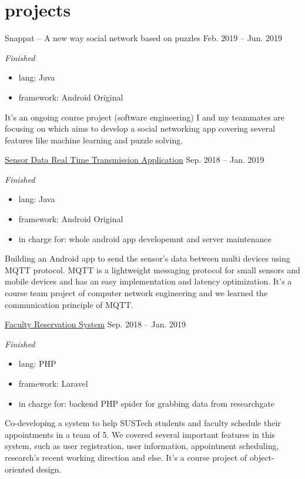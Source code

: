 \documentclass[hidelinks__VERSION__]{adamyi-cv}
\begin{document}
\pagebreak


\section{projects}

\begin{entrylist}


\entry
{Snappat -- A new way social network based on puzzles}
{Feb. 2019 -- Jun. 2019}
{\emph{Finished}
\begin{itemize}
    \item lang: Java
    \item framework: Android Original
\end{itemize}
It's an ongoing course project (software engineering) I and my teammates are focusing on which aims to develop a social networking app covering several features like machine learning and puzzle solving.
}


\entry
{\href{https://github.com/hackroid/MqttSensorDemo}{Sensor Data Real Time Transmission Application}}
{Sep. 2018 -- Jan. 2019}
{\emph{Finished}
\begin{itemize}
    \item lang: Java
    \item framework: Android Original
    \item in charge for: whole android app developemnt and server maintenance
\end{itemize}
Building an Android app to send the sensor's data between multi devices using MQTT protocol. MQTT is a lightweight messaging protocol for small sensors and mobile devices and has an easy implementation and latency optimization. It's a course team project of computer network engineering and we learned the communication principle of MQTT.
}


\entry
{\href{https://github.com/zhaoweizhong/Faculty-Reservation}{Faculty Reservation System}}
{Sep. 2018 -- Jan. 2019}
{\emph{Finished}
\begin{itemize}
    \item lang: PHP
    \item framework: Laravel
    \item in charge for: backend PHP spider for grabbing data from researchgate
\end{itemize}
Co-developing a system to help SUSTech students and faculty schedule their appointments in a team of 5. We covered several important features in this system, such as user registration, user information, appointment scheduling, research's recent working direction and else. It's a course project of object-oriented design.
}



\end{entrylist}
\end{document}
